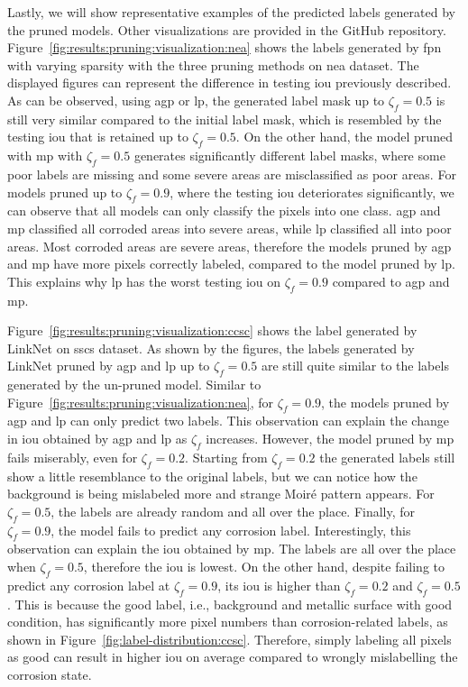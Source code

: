 \documentclass[mathematics,article,submit,pdftex,moreauthors]{Definitions/mdpi}
\begin{document}
Lastly, we will show representative examples
of the predicted labels generated by the pruned
models. Other visualizations are provided in the GitHub repository.
Figure~\ref{fig:results:pruning:visualization:nea} 
shows the labels generated by \ac{fpn} 
with varying sparsity with the three pruning methods
on \ac{nea} dataset. 
The displayed figures
can represent the difference in testing \ac{iou}
previously described. As can be observed, 
using \ac{agp} or \ac{lp},
the generated label mask up to $\zeta_f=0.5$ is
still very similar compared to the initial label mask,
which is resembled by the testing \ac{iou}
that is retained up to $\zeta_f=0.5$. 
On the other hand, the model pruned with \ac{mp}
with $\zeta_f=0.5$ generates significantly different
label masks, where some poor labels are missing and
some severe areas are misclassified as poor areas.
For models pruned up to $\zeta_f=0.9$, where 
the testing \ac{iou} deteriorates significantly, 
we can observe that all models can only classify
the pixels into one class. \ac{agp} and \ac{mp}
classified all corroded areas into severe areas,
while \ac{lp} classified all into poor areas. Most
corroded areas are severe areas, therefore 
the models pruned by \ac{agp} and \ac{mp}
have more pixels correctly labeled, compared to the model
pruned by \ac{lp}. This explains 
why \ac{lp} has the worst testing \ac{iou} on
$\zeta_f=0.9$ compared to \ac{agp} and \ac{mp}.

Figure~\ref{fig:results:pruning:visualization:ccsc}
shows the label generated by LinkNet on \ac{sscs} dataset. As shown by the figures,
the labels generated by LinkNet pruned by \ac{agp}
and \ac{lp} up to $\zeta_f=0.5$ are still quite similar to the
labels generated by the un-pruned model. Similar to 
Figure~\ref{fig:results:pruning:visualization:nea},
for $\zeta_f=0.9$, the models pruned by \ac{agp} and
\ac{lp} can only predict two labels. This observation
can explain the change in \ac{iou} obtained by \ac{agp}
and \ac{lp} as $\zeta_f$ increases. However,
the model pruned by \ac{mp} fails miserably, even
for $\zeta_f=0.2$. Starting from $\zeta_f=0.2$ the generated labels
still show a little resemblance to the original labels, but we
can notice how the background is being mislabeled more
and strange Moir\'{e} pattern appears. For $\zeta_f=0.5$, the
labels are already random and all over the place. Finally,
for $\zeta_f=0.9$, the model fails to predict any corrosion 
label. Interestingly, this observation can explain the
\ac{iou} obtained by \ac{mp}. The labels are all over the place
when $\zeta_f=0.5$, therefore the \ac{iou} is lowest. On the other hand,
despite failing to predict any corrosion label at $\zeta_f=0.9$, its \ac{iou}
is higher than $\zeta_f=0.2$ and $\zeta_f=0.5$. This is because the
good label, i.e., background and metallic surface with good
condition, has significantly more pixel numbers than
corrosion-related labels, as shown in Figure~\ref{fig:label-distribution:ccsc}. 
Therefore, simply labeling all pixels as good can result in higher \ac{iou} on average
compared to wrongly mislabelling the corrosion state.  
\end{document}
